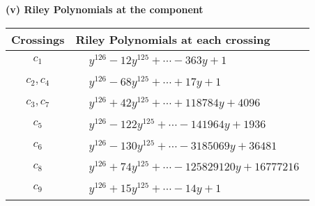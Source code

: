 \documentclass[1p]{elsarticle_modified}
\theoremstyle{definition}
\begin{document}
\newpage\renewcommand{\arraystretch}{1}
\flushleft \textbf{(v) Riley Polynomials at the component}\newline \\
\begin{tabular}{m{50pt}|m{274pt}}
Crossings & \hspace{64pt}Riley Polynomials at each crossing \\
\hline $$\begin{aligned}c_{1}\end{aligned}$$&$\begin{aligned}
&y^{126}-12 y^{125}+\cdots-363 y+1
\end{aligned}$\\
\hline $$\begin{aligned}c_{2},c_{4}\end{aligned}$$&$\begin{aligned}
&y^{126}-68 y^{125}+\cdots+17 y+1
\end{aligned}$\\
\hline $$\begin{aligned}c_{3},c_{7}\end{aligned}$$&$\begin{aligned}
&y^{126}+42 y^{125}+\cdots+118784 y+4096
\end{aligned}$\\
\hline $$\begin{aligned}c_{5}\end{aligned}$$&$\begin{aligned}
&y^{126}-122 y^{125}+\cdots-141964 y+1936
\end{aligned}$\\
\hline $$\begin{aligned}c_{6}\end{aligned}$$&$\begin{aligned}
&y^{126}-130 y^{125}+\cdots-3185069 y+36481
\end{aligned}$\\
\hline $$\begin{aligned}c_{8}\end{aligned}$$&$\begin{aligned}
&y^{126}+74 y^{125}+\cdots-125829120 y+16777216
\end{aligned}$\\
\hline $$\begin{aligned}c_{9}\end{aligned}$$&$\begin{aligned}
&y^{126}+15 y^{125}+\cdots-14 y+1
\end{aligned}$\\

\end{tabular}
\end{document}
